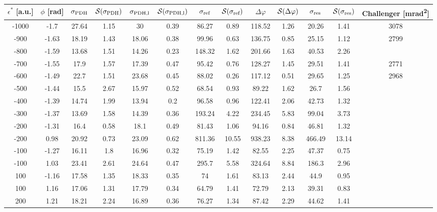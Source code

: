 \begin{landscape}
	
	\begin{table}
	\centering
	\begin{tabular}{|c|c|c|c|c|c|c|c|c|c|c|c|c|}
		\hline
		$\epsilon^*$ [a.u.] & $\phi$ [\si{\radian}] & $\sigma_{\text{PDH}}$ & $\mathcal{S}(\sigma_{\text{PDH}})$ & $\sigma_{\text{PDH,l}}$ & $\mathcal{S}(\sigma_{\text{PDH,l}})$  & $\sigma_{\text{ref}}$ & $\mathcal{S}(\sigma_{\text{ref}})$ & $\Delta \varphi$ & $\mathcal{S}(\Delta \varphi)$ & $\sigma_{\text{res}}$  & $\mathcal{S}(\sigma_{\text{res}})$ & Challenger [\si{\milli\radian\squared}] \\
		\hline
		\hline
		-1000 & -1.7 & 27.64 & 1.15 & 30 & 0.39 & 86.27 & 0.89 & 118.52 & 1.26 & 20.26 & 1.41 & 3078\\
		-900 & -1.63 & 18.19 & 1.43 & 18.06 & 0.38 & 99.96 & 0.63 & 136.75 & 0.85 & 25.15 & 1.12 & 2799\\
		-800 & -1.59 & 13.68 & 1.51 & 14.26 & 0.23 & 148.32 & 1.62 & 201.66 & 1.63 & 40.53 & 2.26 & \\
		-700 & -1.55 & 17.9 & 1.57 & 17.39 & 0.47 & 95.42 & 0.76 & 128.27 & 1.45 & 29.51 & 1.41 & 2771\\
		-600 & -1.49 & 22.7 & 1.51 & 23.68 & 0.45 & 88.02 & 0.26 & 117.12 & 0.51 & 29.65 & 1.25 & 2968\\
		-500 & -1.44 & 15.5 & 2.67 & 15.97 & 0.52 & 68.54 & 0.93 & 89.22 & 1.62 & 26.7 & 1.56 & \\
		-400 & -1.39 & 14.74 & 1.99 & 13.94 & 0.2 & 96.58 & 0.96 & 122.41 & 2.06 & 42.73 & 1.32 & \\
		-300 & -1.37 & 13.69 & 1.58 & 14.39 & 0.36 & 193.24 & 4.22 & 234.45 & 5.83 & 99.04 & 3.73 & \\
		-200 & -1.31 & 16.4 & 0.58 & 18.1 & 0.49 & 81.43 & 1.06 & 94.16 & 0.84 & 46.81 & 1.32 & \\
		-200 & 0.98 & 20.92 & 0.73 & 23.09 & 0.62 & 811.36 & 10.55 & 938.23 & 8.38 & 466.49 & 13.14 & \\
		-100 & -1.27 & 16.11 & 1.8 & 16.96 & 0.32 & 75.19 & 1.42 & 82.55 & 2.25 & 47.37 & 0.75 & \\
		-100 & 1.03 & 23.41 & 2.61 & 24.64 & 0.47 & 295.7 & 5.58 & 324.64 & 8.84 & 186.3 & 2.96 & \\
		100 & -1.16 & 17.58 & 1.35 & 18.33 & 0.35 & 74 & 1.61 & 83.13 & 2.44 & 44.9 & 0.95 & \\
		100 & 1.16 & 17.06 & 1.31 & 17.79 & 0.34 & 64.79 & 1.41 & 72.79 & 2.13 & 39.31 & 0.83 & \\
		200 & 1.21 & 18.21 & 2.24 & 16.89 & 0.36 & 76.27 & 1.34 & 87.42 & 2.29 & 44.62 & 1.41 & \\

\end{tabular}
\end{table}
\end{landscape}
